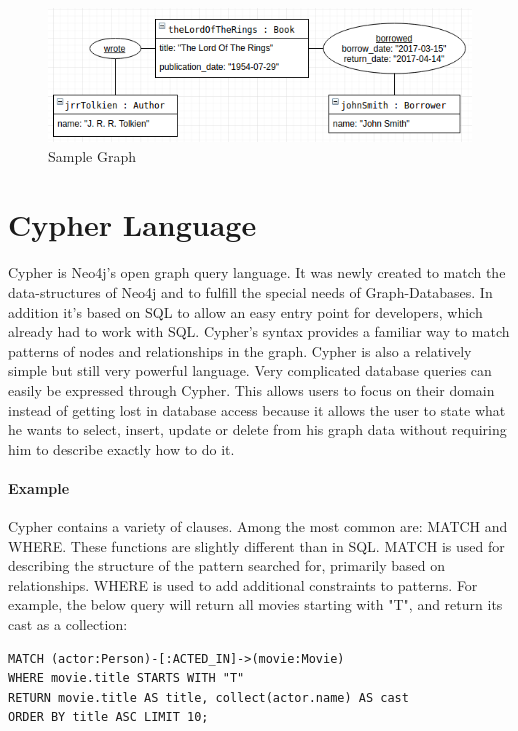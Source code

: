 \begin{figure}[H]
	\includegraphics[width=\linewidth,keepaspectratio]{images/neo4j/data-structure/sample-graph.png}
	\caption{Sample Graph}
\end{figure}

\section{Cypher Language}

Cypher is Neo4j's open graph query language. It was newly created to match the data-structures of Neo4j and to fulfill the special needs of Graph-Databases.
In addition it's based on SQL to allow an easy entry point for developers, which already had to work with SQL. \cite["About Cypher", para. 1]{NeoTechnologyInc.2017d}
Cypher's syntax provides a familiar way to match patterns of nodes and relationships in the graph.
Cypher is also a relatively simple but still very powerful language.
Very complicated database queries can easily be expressed through Cypher.
This allows users to focus on their domain instead of getting lost in database access because it allows the user to state what he wants to select, insert, update or delete from his graph data without requiring him to describe exactly how to do it.

\paragraph{Example}

Cypher contains a variety of clauses. 
Among the most common are: MATCH and WHERE. \cite["A few words about Cypher", para. 3]{NeoTechnologyInc.2017f}
These functions are slightly different than in SQL.
MATCH is used for describing the structure of the pattern searched for, primarily based on relationships.
WHERE is used to add additional constraints to patterns.
For example, the below query will return all movies starting with "T", and return its cast as a collection:
\begin{lstlisting}[frame=single, caption=Cypher Example, label=cypherexample]
MATCH (actor:Person)-[:ACTED_IN]->(movie:Movie)  
WHERE movie.title STARTS WITH "T"  
RETURN movie.title AS title, collect(actor.name) AS cast  
ORDER BY title ASC LIMIT 10;
\end{lstlisting}

